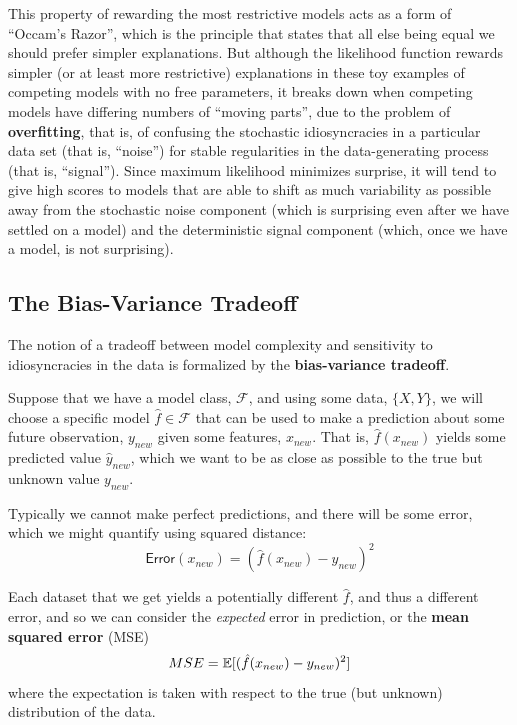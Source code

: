 This property of rewarding the most restrictive models acts as a form
of ``Occam's Razor'', which is the principle that states that all else
being equal we should prefer simpler explanations.  But although the
likelihood function rewards simpler (or at least more restrictive)
explanations in these toy examples of competing models with no free
parameters, it breaks down when competing models have differing
numbers of ``moving parts'', due to the problem of {\bf overfitting},
that is, of confusing the stochastic idiosyncracies 
in a particular data set (that is,
``noise'') for stable regularities in the data-generating process 
(that is, ``signal''). Since maximum
likelihood minimizes surprise, it will tend to give high scores to
models that are able to shift as much variability as possible away
from the stochastic noise component (which is surprising even after we
have settled on a model) and the deterministic signal component
(which, once we have a model, is not surprising).

\subsection{The Bias-Variance Tradeoff}
The notion of a tradeoff between model complexity and 
sensitivity to idiosyncracies in the data is formalized by the {\bf
  bias-variance tradeoff}.

Suppose that we have a model class, $\mathcal{F}$, and using
some data, $\{X,Y\}$, we will choose a specific model $\hat{f} \in \mathcal{F}$
that can be used to make a prediction about some future observation,
$y_{new}$ given some features, $x_{new}$.  That is, $\hat{f}(x_{new})$
yields some predicted value $\hat{y}_{new}$, which we want to be as
close as possible to the true but unknown value $y_{new}$.

Typically we cannot make perfect predictions, and there will be some
error, which we might quantify using squared distance:
\begin{equation*}
  \mathsf{Error}(x_{new}) = (\hat{f}(x_{new}) - y_{new})^2
\end{equation*}

Each dataset that we get yields a potentially different $\hat{f}$, and
thus a different error, and so we can consider the {\em expected}
error in prediction, or the {\bf mean squared error} (MSE)
\begin{equation*}
  MSE = \mathbb{E}[(\hat{f}(x_{new}) - y_{new})^2]
\end{equation*}
where the expectation is taken with respect to the true (but unknown) 
distribution of the data.

